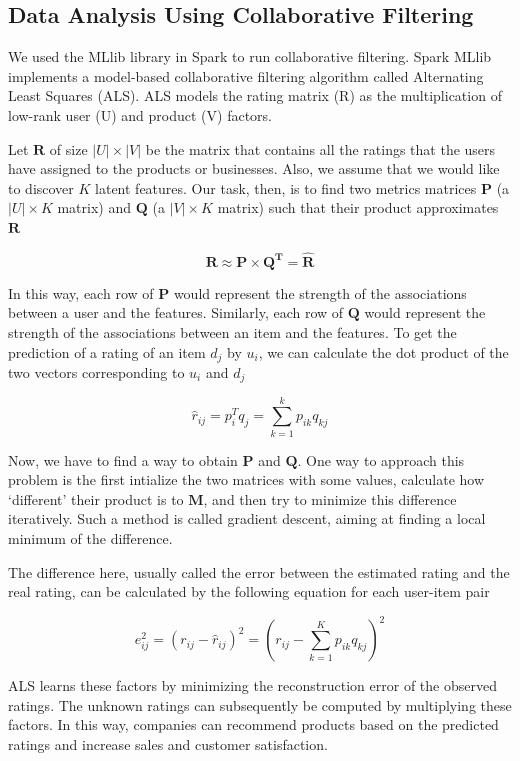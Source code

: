 \documentclass[conference]{IEEEtran}
\begin{document}
\subsection{Data Analysis Using Collaborative Filtering}

We used the MLlib library in Spark to run collaborative filtering. Spark MLlib implements a model-based collaborative filtering algorithm called Alternating Least Squares (ALS). ALS models the rating matrix (R) as the multiplication of low-rank user (U) and product (V) factors.  


Let $\boldsymbol{R}$ of size $|U| \times |V|$ be the matrix that contains all the ratings that the users have assigned to the products or businesses. Also, we assume that we would like to discover $K$ latent features. Our task, then, is to find two metrics matrices $\boldsymbol{P}$ (a $|U| \times K$ matrix) and $\boldsymbol{Q}$ (a $|V| \times K$ matrix) such that their product approximates $\boldsymbol{R}$

$$ \boldsymbol{R \approx P \times Q^T = \hat{R}} $$

In this way, each row of $\boldsymbol{P}$ would represent the strength of the associations between a user and the features. Similarly, each row of $\boldsymbol{Q}$ would represent the strength of the associations between an item and the features. To get the prediction of a rating of an item $d_j$ by $u_i$, we can calculate the dot product of the two vectors corresponding to $u_i$ and $d_j$

$$ \hat{r}_{ij} = p^T_i q_j = \sum_{k=1}^{k}p_{ik} q_{kj} $$

Now, we have to find a way to obtain $\boldsymbol{P}$ and $\boldsymbol{Q}$. One way to approach this problem is the first intialize the two matrices with some values, calculate how `different’ their product is to $\boldsymbol{M}$, and then try to minimize this difference iteratively. Such a method is called gradient descent, aiming at finding a local minimum of the difference.

The difference here, usually called the error between the estimated rating and the real rating, can be calculated by the following equation for each user-item pair

$$ e^2_{ij} = (r_{ij} - \hat{r}_{ij})^2 = (r_{ij} - \sum_{k=1}^{K}p_{ik} q_{kj})^2 $$

ALS learns these factors by minimizing the reconstruction error of the observed ratings. The unknown ratings can subsequently be computed by multiplying these factors. In this way, companies can recommend products based on the predicted ratings and increase sales and customer satisfaction.
\end{document}
